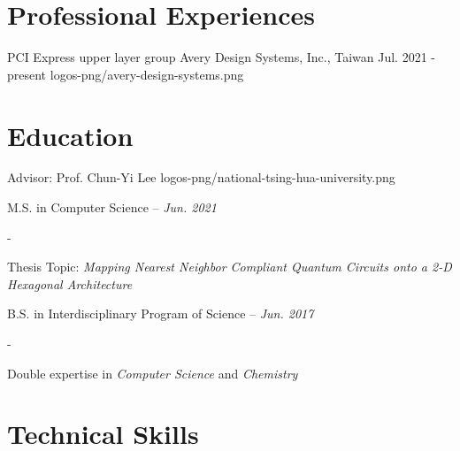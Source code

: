 \documentclass{cvclass}
\begin{document}
\makeinfo


\section{Professional Experiences}

    {PCI Express upper layer group}
    {Avery Design Systems, Inc., Taiwan}
    {Jul. 2021 - present}
    {logos-png/avery-design-systems.png}


\section{Education}

        {Advisor: Prof. Chun-Yi Lee}
        {logos-png/national-tsing-hua-university.png}{
    \item M.S. in Computer Science -- \textit{Jun. 2021}
    \begin{plainitemize}{-}
        \item Thesis Topic: \textit{Mapping Nearest Neighbor Compliant Quantum Circuits onto a 2-D Hexagonal Architecture}
    \end{plainitemize}
    \item B.S. in Interdisciplinary Program of Science -- \textit{Jun. 2017}
    \begin{plainitemize}{-}
        \item Double expertise in \textit{Computer Science} and \textit{Chemistry}
    \end{plainitemize}}




\section{Technical Skills}
\end{document}
